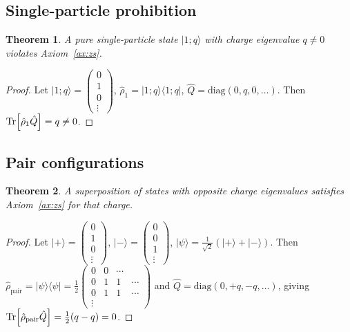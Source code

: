 \documentclass[12pt,a4paper]{article}
\newtheorem{theorem}{Theorem}[section]
\theoremstyle{definition}
\theoremstyle{remark}
\newcommand{\rhohat}{\hat{\rho}}
\newcommand{\Qhat}{\hat{Q}}
\begin{document}
\subsection{Single-particle prohibition}

\begin{theorem}\label{thm:single}
A pure single-particle state $|1;q\rangle$ with charge eigenvalue $q \neq 0$
violates Axiom~\ref{ax:zs}.
\end{theorem}
\begin{proof}
Let $|1;q\rangle = \begin{pmatrix}0\\1\\0\\\vdots\end{pmatrix}$,
$\rhohat_1 = |1;q\rangle\langle 1;q|$,
$\Qhat = \mathrm{diag}(0,q,0,\ldots)$.
Then $\Tr[\rhohat_1\Qhat] = q \neq 0$.
\end{proof}

\subsection{Pair configurations}

\begin{theorem}\label{thm:pair}
A superposition of states with opposite charge eigenvalues satisfies
Axiom~\ref{ax:zs} for that charge.
\end{theorem}
\begin{proof}
Let $|+\rangle = \begin{pmatrix}0\\1\\0\\\vdots\end{pmatrix}$,
$|-\rangle = \begin{pmatrix}0\\0\\1\\\vdots\end{pmatrix}$,
$|\psi\rangle = \frac{1}{\sqrt{2}}(|+\rangle + |-\rangle)$.
Then $\rhohat_\mathrm{pair} = |\psi\rangle\langle\psi| =
\frac{1}{2}\begin{pmatrix}0&0&\cdots\\0&1&1&\cdots\\0&1&1&\cdots\\
\vdots\end{pmatrix}$
and $\Qhat = \mathrm{diag}(0,+q,-q,\ldots)$, giving
$\Tr[\rhohat_\mathrm{pair}\Qhat] = \frac{1}{2}(q - q) = 0$.
\end{proof}
\end{document}
